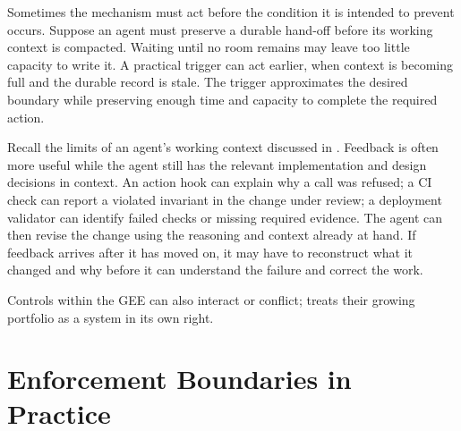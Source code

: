 
Sometimes the mechanism must act before the condition it is intended to prevent occurs. Suppose an agent must preserve a durable hand-off before its working context is compacted. Waiting until no room remains may leave too little capacity to write it. A practical trigger can act earlier, when context is becoming full and the durable record is stale. The trigger approximates the desired boundary while preserving enough time and capacity to complete the required action.





Recall the limits of an agent's working context discussed in . Feedback is often more useful while the agent still has the relevant implementation and design decisions in context. An action hook can explain why a call was refused; a CI check can report a violated invariant in the change under review; a deployment validator can identify failed checks or missing required evidence. The agent can then revise the change using the reasoning and context already at hand. If feedback arrives after it has moved on, it may have to reconstruct what it changed and why before it can understand the failure and correct the work.


Controls within the GEE can also interact or conflict;  treats their growing portfolio as a system in its own right.

\section{Enforcement Boundaries in Practice}\label{heading:enforcement-boundaries-in-practice}

